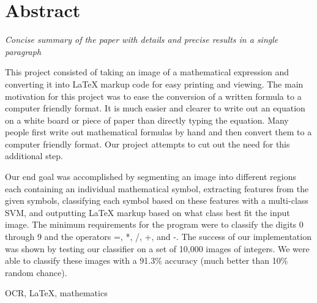 \section{Abstract}
\textit{Concise summary of the paper with details and precise results in a single paragraph
}

This project consisted of taking an image of a mathematical expression and converting it into LaTeX markup code for easy printing and viewing.  The main motivation for this project was to ease the conversion of a written formula to a computer friendly format.  It is much easier and clearer to write out an equation on a white board or piece of paper than directly typing the equation. Many people first write out mathematical formulas by hand and then convert them to a computer friendly format.  Our project attempts to cut out the need for this additional step.  

Our end goal was accomplished by segmenting an image into different regions each containing an individual mathematical symbol, extracting features from the given symbols, classifying each symbol based on these features with a multi-class SVM, and outputting LaTeX markup based on what class best fit the input image.  The minimum requirements for the program were to classify the digits 0 through 9 and the operators =, *, /, +, and -.  The success of our implementation was shown by testing our classifier on a set of 10,000 images of integers. We were able to classify these images with a 91.3\% accuracy (much better than 10\% random chance).

\begin{keywords}
OCR, LaTeX, mathematics
\end{keywords}